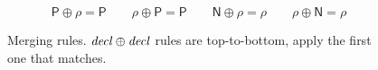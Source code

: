 \begin{figure}
\[
\textsf{P} \oplus \rho = \textsf{P} \qquad
\rho \oplus \textsf{P} = \textsf{P} \qquad
\textsf{N} \oplus \rho = \rho \qquad
\rho \oplus \textsf{N} = \rho
\]

\caption{Merging rules.  $\mathit{decl} \oplus \mathit{decl}$ rules are top-to-bottom, apply the first one that matches.}
\label{typing:merging}
\end{figure}
